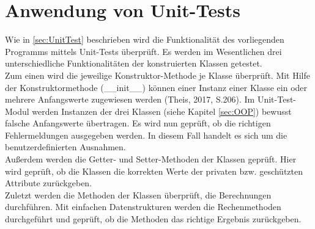 \documentclass[11pt,a4paper]{scrreprt}
\begin{document}
\section{Anwendung von Unit-Tests}
Wie in \ref{sec:UnitTest} beschrieben wird die Funktionalität des vorliegenden Programms mittels Unit-Tests überprüft. Es werden im Wesentlichen drei unterschiedliche Funktionalitäten der konstruierten Klassen getestet. \\
Zum einen wird die jeweilige Konstruktor-Methode je Klasse überprüft. Mit Hilfe der Konstruktormethode (\_\_init\_\_) können  einer Instanz einer Klasse ein oder mehrere Anfangswerte zugewiesen werden (Theis, 2017, S.206). Im Unit-Test-Modul werden Instanzen der drei Klassen (siehe Kapitel \ref{sec:OOP}) bewusst falsche Anfangswerte übertragen. Es wird nun geprüft, ob die richtigen Fehlermeldungen ausgegeben werden. In diesem Fall handelt es sich um die benutzerdefinierten Ausnahmen. \\
Außerdem werden die Getter- und Setter-Methoden der Klassen geprüft. Hier wird geprüft, ob die Klassen die korrekten Werte der privaten bzw. geschützten Attribute zurückgeben. \\
Zuletzt werden die Methoden der Klassen überprüft, die Berechnungen durchführen. Mit einfachen Datenstrukturen werden die Rechenmethoden durchgeführt und geprüft, ob die Methoden das richtige Ergebnis zurückgeben. 
\end{document}
